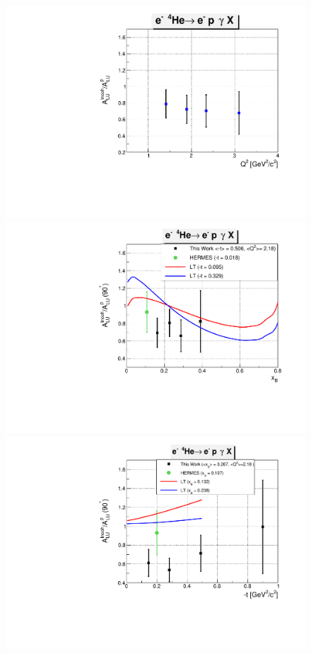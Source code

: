 \begin{figure}[tp]
\centering
\includegraphics[scale=0.37]{fig_updated/BSA_ratio_incoh_Q2.pdf}\\
\includegraphics[scale=0.37]{fig_updated/BSA_ratio_incoh_xB.pdf}\\
\includegraphics[scale=0.37]{fig_updated/BSA_ratio_incoh_t.pdf}

\end{figure}
